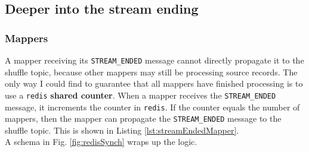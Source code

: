 \subsection{Deeper into the stream ending}
\label{sec:streamEnding}

\subsubsection{Mappers}
A mapper receiving its \verb|STREAM_ENDED| message cannot directly propagate it to the shuffle topic, because other mappers may still be processing source records.
The only way I could find to guarantee that all mappers have finished processing is to use a \texttt{redis} \textbf{shared counter}.
When a mapper receives the \verb|STREAM_ENDED| message, it increments the counter in \texttt{redis}.
If the counter equals the number of mappers, then the mapper can propagate the \verb|STREAM_ENDED| message to the shuffle topic.
This is shown in Listing \ref{lst:streamEndedMapper}.\\
A schema in Fig. \ref{fig:redisSynch} wraps up the logic.

